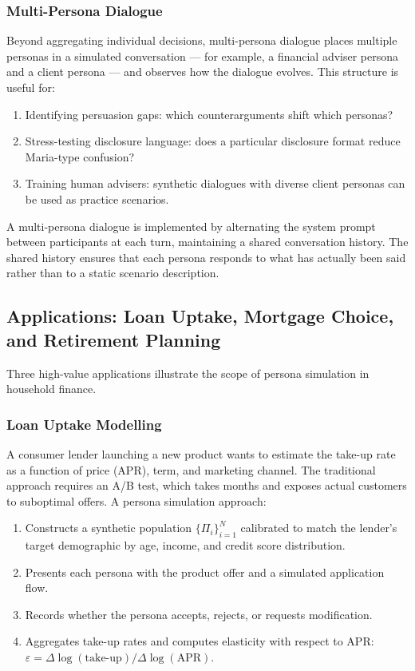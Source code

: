 \begin{context}
\subsubsection*{Multi-Persona Dialogue}

Beyond aggregating individual decisions, multi-persona dialogue places multiple personas in a simulated conversation --- for example, a financial adviser persona and a client persona --- and observes how the dialogue evolves. This structure is useful for:

\begin{enumerate}
  \item Identifying persuasion gaps: which counterarguments shift which personas?
  \item Stress-testing disclosure language: does a particular disclosure format reduce Maria-type confusion?
  \item Training human advisers: synthetic dialogues with diverse client personas can be used as practice scenarios.
\end{enumerate}

A multi-persona dialogue is implemented by alternating the system prompt between participants at each turn, maintaining a shared conversation history. The shared history ensures that each persona responds to what has actually been said rather than to a static scenario description.

\subsection{Applications: Loan Uptake, Mortgage Choice, and Retirement Planning}
\label{subsec:persona-apps}

Three high-value applications illustrate the scope of persona simulation in household finance.

\subsubsection*{Loan Uptake Modelling}

A consumer lender launching a new product wants to estimate the take-up rate as a function of price (APR), term, and marketing channel. The traditional approach requires an A/B test, which takes months and exposes actual customers to suboptimal offers. A persona simulation approach:

\begin{enumerate}
  \item Constructs a synthetic population $\{\Pi_i\}_{i=1}^{N}$ calibrated to match the lender's target demographic by age, income, and credit score distribution.
  \item Presents each persona with the product offer and a simulated application flow.
  \item Records whether the persona accepts, rejects, or requests modification.
  \item Aggregates take-up rates and computes elasticity with respect to APR: $\varepsilon = \Delta \log(\text{take-up}) / \Delta \log(\text{APR})$.
\end{enumerate}


\end{context}
